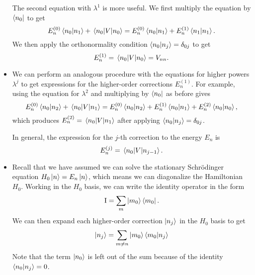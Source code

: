 \documentclass[11pt, a4paper]{article}
\newcommand{\Schro}{Schr\"{o}dinger\xspace}
\newcommand{\Ham}{Hamiltonian\xspace}
\newcommand{\II}{\operatorname{I}}  %
\begin{document}
\begin{itemize}
    The second equation with $ \lambda^{1} $ is more useful. We first multiply the equation by $ \bra{n_{0}} $ to get
    \begin{equation*}
        E_{n}^{(0)} \braket{n_{0}}{n_{1}} + \mel{n_{0}}{V}{n_{0}} = E_{n}^{(0)}\braket{n_{0}}{n_{1}} + E_{n}^{(1)}\braket{n_{1}}{n_{1}}.
    \end{equation*}
     We then apply the orthonormality condition $ \braket{n_{0}}{n_{j}} = \delta_{0j} $ to get 
     \begin{equation*}
         E_{n}^{(1)} = \mel{n_{0}}{V}{n_{0}} = V_{nn}.
     \end{equation*}

     \item We can perform an analogous procedure with the equations for higher powers $ \lambda^{j} $ to get expressions for the higher-order corrections $ E_{n}^{(1)} $. For example, using the equation for $ \lambda^{2} $ and multiplying by $ \bra{n_{0}} $ as before gives
    \begin{equation*}
        E_{n}^{(0)} \braket{n_{0}}{n_{2}} + \mel{n_{0}}{V}{n_{1}} = E_{n}^{(0)}\braket{n_{0}}{n_{2}} + E_{n}^{(1)}\braket{n_{0}}{n_{1}} + E_{n}^{(2)}\braket{n_{0}}{n_{0}}, 
    \end{equation*}
    which produces $ E_{n}^{(2)} = \mel{n_{0}}{V}{n_{1}}$ after applying $ \braket{n_{0}}{n_{j}} = \delta_{0j} $. 

    In general, the expression for the $ j $-th correction to the energy $ E_{n} $ is
    \begin{equation*}
        E_{n}^{(j)} = \mel{n_{0}}{V}{n_{j-1}}.
    \end{equation*}
    
    \item Recall that we have assumed we can solve the stationary \Schro equation $ H_{0} \ket{n} = E_{n} \ket{n} $, which means we can diagonalize the \Ham $ H_{0} $. Working in the $ H_{0} $ basis, we can write the identity operator in the form
    \begin{equation*}
        \II = \sum_{m}\ket{m_{0}}\bra{m_{0}}.
    \end{equation*}
    We can then expand each higher-order correction $ \ket{n_{j}} $ in the $ H_{0} $ basis to get
    \begin{equation*}
        \ket{n_{j}} = \sum_{m \neq n}\ket{m_{0}}\braket{m_{0}}{n_{j}}
    \end{equation*}
    Note that the term $ \ket{n_{0}} $ is left out of the sum because of the identity $ \braket{n_{0}}{n_{j}} = 0 $. 


\end{itemize}
\end{document}
